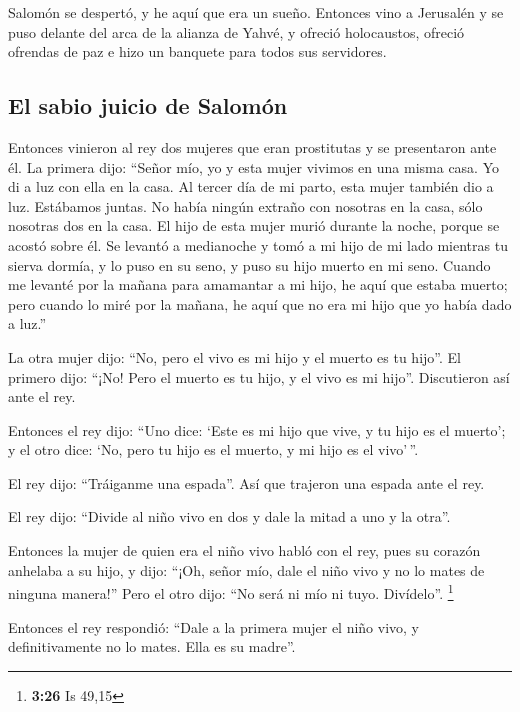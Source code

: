  Salomón se despertó, y he aquí que era un sueño.
Entonces vino a Jerusalén y se puso delante del arca de la alianza de
Yahvé, y ofreció holocaustos, ofreció ofrendas de paz e hizo un banquete
para todos sus servidores.

\hypertarget{el-sabio-juicio-de-salomuxf3n}{%
\subsection{El sabio juicio de
Salomón}\label{el-sabio-juicio-de-salomuxf3n}}

 Entonces vinieron al rey dos mujeres que eran
prostitutas y se presentaron ante él.  La primera dijo:
``Señor mío, yo y esta mujer vivimos en una misma casa. Yo di a luz con
ella en la casa.  Al tercer día de mi parto, esta mujer
también dio a luz. Estábamos juntas. No había ningún extraño con
nosotras en la casa, sólo nosotras dos en la casa.  El
hijo de esta mujer murió durante la noche, porque se acostó sobre él.
 Se levantó a medianoche y tomó a mi hijo de mi lado
mientras tu sierva dormía, y lo puso en su seno, y puso su hijo muerto
en mi seno.  Cuando me levanté por la mañana para
amamantar a mi hijo, he aquí que estaba muerto; pero cuando lo miré por
la mañana, he aquí que no era mi hijo que yo había dado a luz.''

 La otra mujer dijo: ``No, pero el vivo es mi hijo y el
muerto es tu hijo''. El primero dijo: ``¡No! Pero el muerto es tu hijo,
y el vivo es mi hijo''. Discutieron así ante el rey.

 Entonces el rey dijo: ``Uno dice: `Este es mi hijo que
vive, y tu hijo es el muerto'; y el otro dice: `No, pero tu hijo es el
muerto, y mi hijo es el vivo'\,''.

 El rey dijo: ``Tráiganme una espada''. Así que trajeron
una espada ante el rey.

 El rey dijo: ``Divide al niño vivo en dos y dale la
mitad a uno y la otra''.

 Entonces la mujer de quien era el niño vivo habló con el
rey, pues su corazón anhelaba a su hijo, y dijo: ``¡Oh, señor mío, dale
el niño vivo y no lo mates de ninguna manera!'' Pero el otro dijo: ``No
será ni mío ni tuyo. Divídelo''. \footnote{\textbf{3:26} Is 49,15}

 Entonces el rey respondió: ``Dale a la primera mujer el
niño vivo, y definitivamente no lo mates. Ella es su madre''.

